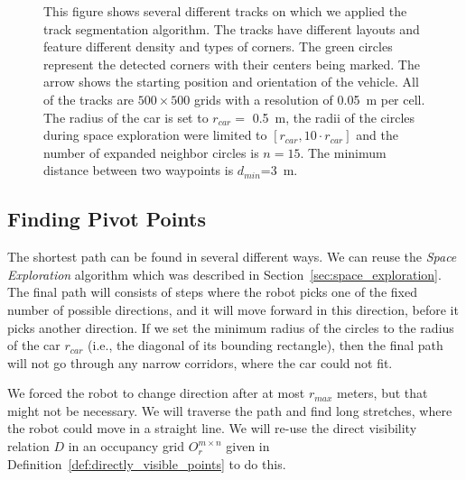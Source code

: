\begin{figure}[]
	\label{fig:corner_detection}
	\caption{This figure shows several different tracks on which we applied the track segmentation algorithm. The tracks have different layouts and feature different density and types of corners. The green circles represent the detected corners with their centers being marked. The arrow shows the starting position and orientation of the vehicle. All of the tracks are $500\times 500$ grids with a resolution of \protect \SI{0.05}{\meter} per cell. The radius of the car is set to $r_{car}=$ \protect\SI{0.5}{\meter}, the radii of the circles during space exploration were limited to $\left[r_{car}, 10\cdot r_{car}\right]$ and the number of expanded neighbor circles is $n=15$. The minimum distance between two waypoints is $d_{min}$=\protect\SI{3}{\meter}.}
\end{figure}


\subsection{Finding Pivot Points}
The shortest path can be found in several different ways. We can reuse the \textit{Space Exploration} algorithm which was described in Section~\ref{sec:space_exploration}. The final path will consists of steps where the robot picks one of the fixed number of possible directions, and it will move forward in this direction, before it picks another direction. If we set the minimum radius of the circles to the radius of the car $r_{car}$ (i.e., the diagonal of its bounding rectangle), then the final path will not go through any narrow corridors, where the car could not fit.

We forced the robot to change direction after at most $r_{max}$ meters, but that might not be necessary. We will traverse the path and find long stretches, where the robot could move in a straight line. We will re-use the direct visibility relation $D$ in an occupancy grid $O_r^{m\times n}$ given in Definition~\ref{def:directly_visible_points} to do this.

